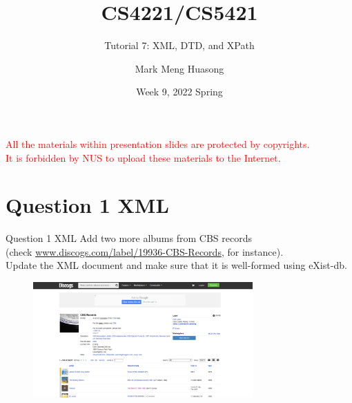 \title{CS4221/CS5421}

\subtitle{Tutorial 7: XML, DTD, and XPath}

\author{Mark Meng Huasong}



\date{Week 9, 2022 Spring}


\begin{frame}
	\titlepage
	\begin{tcolorbox}
		\begin{center}
			{\scriptsize \textcolor{red}{All the materials within presentation slides are protected by copyrights.\\
					It is forbidden by NUS to upload these materials to the Internet.}}
		\end{center}
	\end{tcolorbox}
\end{frame}

\section*{Question 1 XML}

\begin{frame}[fragile]{Question 1 XML}
	Add two more albums from CBS records\\
	(check \url{www.discogs.com/label/19936-CBS-Records}, for instance).\\
	Update the XML document and make sure that it is well-formed using eXist-db.
	\vspace{10pt}
	
	\begin{figure}
		\includegraphics[width=0.75\textwidth,frame]{4221-t7/cbs_record.png}
	\end{figure}\vspace{-10pt}
\end{frame}


